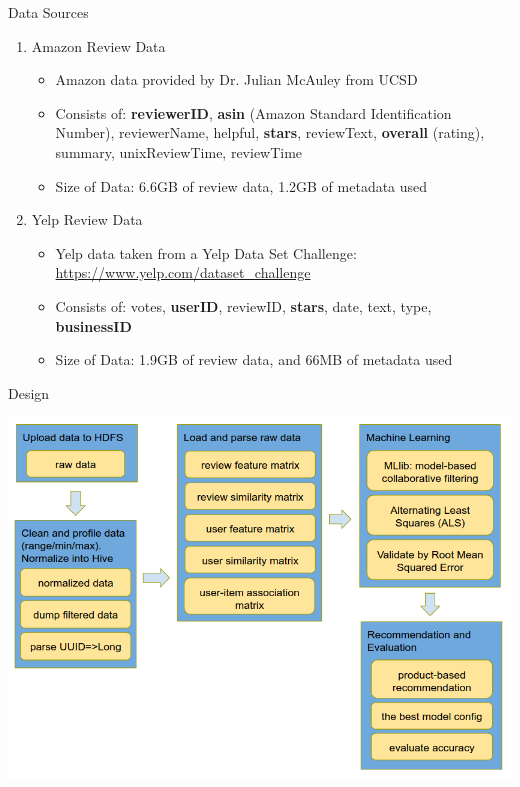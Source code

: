 \documentclass{beamer}
\begin{document}
\begin{frame}{Data Sources}
  \begin{enumerate}
      \item {Amazon Review Data}
      \begin{itemize}
          \item {Amazon data provided by Dr. Julian McAuley from UCSD}
          \item{Consists of: \textbf{reviewerID}, \textbf{asin} (Amazon Standard Identification Number), reviewerName, helpful, \textbf{stars}, reviewText, \textbf{overall} (rating), summary, unixReviewTime, reviewTime}
          \item {Size of Data: 6.6GB of review data, 1.2GB of metadata used}
      \end{itemize}
      \item{Yelp Review Data}
      \begin{itemize}
          \item {Yelp data taken from a Yelp Data Set Challenge: \url{https://www.yelp.com/dataset_challenge} }
          \item{Consists of: votes, \textbf{userID}, reviewID, \textbf{stars}, date, text, type, \textbf{businessID}}
          \item{Size of Data: 1.9GB of review data, and 66MB of metadata used}
      \end{itemize}
  \end{enumerate}
\end{frame}



\begin{frame}{Design}{}

 \includegraphics[width=1\textwidth]{image/design_v2}
 
  
\end{frame}
\end{document}
